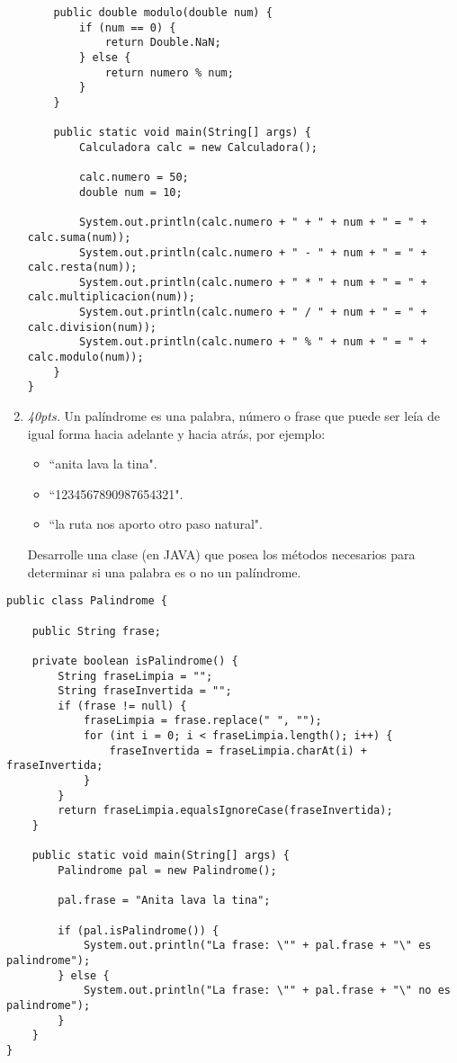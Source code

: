 \documentclass[10pt]{article}
\begin{document}
\begin{enumerate}
\begin{verbatim}
    public double modulo(double num) {
        if (num == 0) {
            return Double.NaN;
        } else {
            return numero % num;
        }
    }
    
    public static void main(String[] args) {
        Calculadora calc = new Calculadora();
        
        calc.numero = 50;
        double num = 10;
        
        System.out.println(calc.numero + " + " + num + " = " + calc.suma(num));
        System.out.println(calc.numero + " - " + num + " = " + calc.resta(num));
        System.out.println(calc.numero + " * " + num + " = " + calc.multiplicacion(num));
        System.out.println(calc.numero + " / " + num + " = " + calc.division(num));
        System.out.println(calc.numero + " % " + num + " = " + calc.modulo(num));
    }
}

\end{verbatim}

\newpage

\item \emph{40pts.} Un pal\'indrome es una palabra, n\'umero o frase que puede ser le\'ia de igual forma hacia adelante y hacia atr\'as, por ejemplo:
		\begin{itemize}
			\item[] ``anita lava la tina".
			\item[] ``1234567890987654321".
			\item[] ``la ruta nos aporto otro paso natural".
		\end{itemize}
Desarrolle una clase (en JAVA) que posea los m\'etodos necesarios para determinar si una palabra es o no un pal\'indrome.
\end{enumerate}


\begin{verbatim}
public class Palindrome {

    public String frase;

    private boolean isPalindrome() {
        String fraseLimpia = "";
        String fraseInvertida = "";
        if (frase != null) {
            fraseLimpia = frase.replace(" ", "");
            for (int i = 0; i < fraseLimpia.length(); i++) {
                fraseInvertida = fraseLimpia.charAt(i) + fraseInvertida;
            }
        }
        return fraseLimpia.equalsIgnoreCase(fraseInvertida);
    }

    public static void main(String[] args) {
        Palindrome pal = new Palindrome();

        pal.frase = "Anita lava la tina";

        if (pal.isPalindrome()) {
            System.out.println("La frase: \"" + pal.frase + "\" es palindrome");
        } else {
            System.out.println("La frase: \"" + pal.frase + "\" no es palindrome");
        }
    }
}

\end{verbatim}
\end{document}
